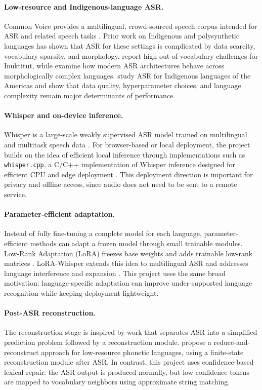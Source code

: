 \documentclass[11pt]{article}
\begin{document}
\paragraph{Low-resource and Indigenous-language ASR.}
Common Voice provides a multilingual, crowd-sourced speech corpus intended for ASR and related speech tasks \citep{ardila-etal-2020-common}. Prior work on Indigenous and polysynthetic languages has shown that ASR for these settings is complicated by data scarcity, vocabulary sparsity, and morphology. \citet{gupta-boulianne-2020-automatic} report high out-of-vocabulary challenges for Inuktitut, while \citet{leferrand-etal-2024-modern} examine how modern ASR architectures behave across morphologically complex languages. \citet{romero2024automatic} study ASR for Indigenous languages of the Americas and show that data quality, hyperparameter choices, and language complexity remain major determinants of performance.

\paragraph{Whisper and on-device inference.}
Whisper is a large-scale weakly supervised ASR model trained on multilingual and multitask speech data \citep{radford2023robust}. For browser-based or local deployment, the project builds on the idea of efficient local inference through implementations such as \texttt{whisper.cpp}, a C/C++ implementation of Whisper inference designed for efficient CPU and edge deployment \citep{whispercpp}. This deployment direction is important for privacy and offline access, since audio does not need to be sent to a remote service.

\paragraph{Parameter-efficient adaptation.}
Instead of fully fine-tuning a complete model for each language, parameter-efficient methods can adapt a frozen model through small trainable modules. Low-Rank Adaptation (LoRA) freezes base weights and adds trainable low-rank matrices \citep{hu2021lora}. LoRA-Whisper extends this idea to multilingual ASR and addresses language interference and expansion \citep{song2024lora}. This project uses the same broad motivation: language-specific adaptation can improve under-supported language recognition while keeping deployment lightweight.

\paragraph{Post-ASR reconstruction.}
The reconstruction stage is inspired by work that separates ASR into a simplified prediction problem followed by a reconstruction module. \citet{diwan2021reduce} propose a reduce-and-reconstruct approach for low-resource phonetic languages, using a finite-state reconstruction module after ASR. In contrast, this project uses confidence-based lexical repair: the ASR output is produced normally, but low-confidence tokens are mapped to vocabulary neighbors using approximate string matching.
\end{document}
